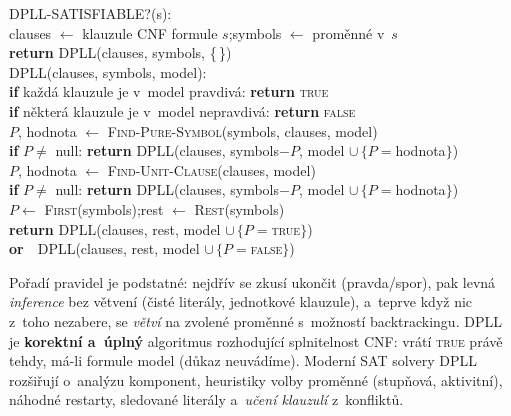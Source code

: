\begin{algo}
\ttfamily\small
DPLL-SATISFIABLE?(s):\\
\hspace*{1.5em}clauses $\leftarrow$ klauzule CNF formule $s$;\quad symbols $\leftarrow$ proměnné v~$s$\\
\hspace*{1.5em}\textbf{return} DPLL(clauses, symbols, \{\,\}) \\[2pt]
DPLL(clauses, symbols, model):\\
\hspace*{1.5em}\textbf{if} každá klauzule je v~model pravdivá: \textbf{return} \textsc{true} \\
\hspace*{1.5em}\textbf{if} některá klauzule je v~model nepravdivá: \textbf{return} \textsc{false} \\
\hspace*{1.5em}$P$, hodnota $\leftarrow$ \textsc{Find-Pure-Symbol}(symbols, clauses, model) \\
\hspace*{1.5em}\textbf{if} $P\neq$ null: \textbf{return} DPLL(clauses, symbols$-P$, model $\cup\,\{P=$hodnota$\}$)\\
\hspace*{1.5em}$P$, hodnota $\leftarrow$ \textsc{Find-Unit-Clause}(clauses, model) \\
\hspace*{1.5em}\textbf{if} $P\neq$ null: \textbf{return} DPLL(clauses, symbols$-P$, model $\cup\,\{P=$hodnota$\}$)\\
\hspace*{1.5em}$P\leftarrow$ \textsc{First}(symbols);\quad rest $\leftarrow$ \textsc{Rest}(symbols) \\
\hspace*{1.5em}\textbf{return} DPLL(clauses, rest, model $\cup\,\{P=$\textsc{true}$\}$)\\
\hspace*{4.5em}\textbf{or}\ \, DPLL(clauses, rest, model $\cup\,\{P=$\textsc{false}$\}$)
\end{algo}

\noindent Pořadí pravidel je podstatné: nejdřív se zkusí ukončit (pravda/spor), pak levná \emph{inference} bez větvení (čisté literály, jednotkové klauzule), a~teprve když nic z~toho nezabere, se \emph{větví} na zvolené proměnné s~možností backtrackingu. DPLL je \textbf{korektní a~úplný} algoritmus rozhodující splnitelnost CNF: vrátí \textsc{true} právě tehdy, má-li formule model (důkaz neuvádíme). Moderní SAT solvery DPLL rozšiřují o~analýzu komponent, heuristiky volby proměnné (stupňová, aktivitní), náhodné restarty, sledované literály a~\emph{učení klauzulí} z~konfliktů.

